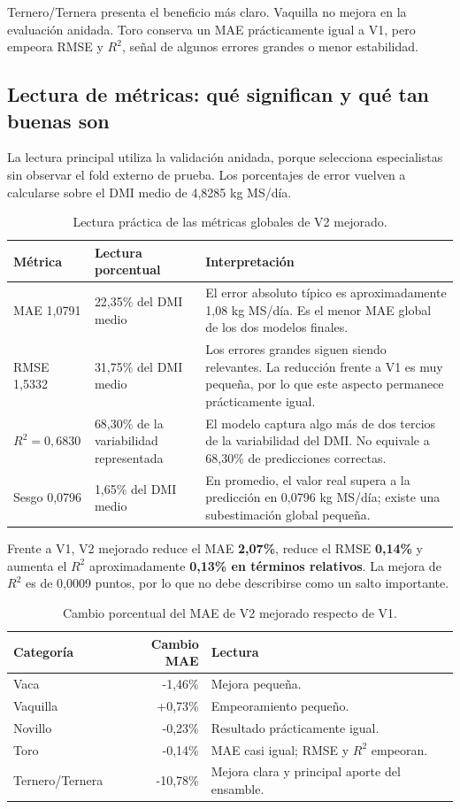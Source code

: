 \documentclass[11pt,a4paper]{article}
\begin{document}
Ternero/Ternera presenta el beneficio más claro. Vaquilla no mejora en la evaluación anidada. Toro conserva un MAE prácticamente igual a V1, pero empeora RMSE y $R^2$, señal de algunos errores grandes o menor estabilidad.

\subsection{Lectura de métricas: qué significan y qué tan buenas son}

La lectura principal utiliza la validación anidada, porque selecciona especialistas sin observar el fold externo de prueba. Los porcentajes de error vuelven a calcularse sobre el DMI medio de 4,8285 kg MS/día.

\begin{table}[H]
\centering
\caption{Lectura práctica de las métricas globales de V2 mejorado.}
\begin{tabularx}{\textwidth}{p{2.5cm}p{2.8cm}X}
\toprule
\textbf{Métrica} & \textbf{Lectura porcentual} & \textbf{Interpretación}\\
\midrule
MAE 1,0791 & 22,35\% del DMI medio & El error absoluto típico es aproximadamente 1,08 kg MS/día. Es el menor MAE global de los dos modelos finales.\\
RMSE 1,5332 & 31,75\% del DMI medio & Los errores grandes siguen siendo relevantes. La reducción frente a V1 es muy pequeña, por lo que este aspecto permanece prácticamente igual.\\
$R^2=0,6830$ & 68,30\% de la variabilidad representada & El modelo captura algo más de dos tercios de la variabilidad del DMI. No equivale a 68,30\% de predicciones correctas.\\
Sesgo 0,0796 & 1,65\% del DMI medio & En promedio, el valor real supera a la predicción en 0,0796 kg MS/día; existe una subestimación global pequeña.\\
\bottomrule
\end{tabularx}
\end{table}

Frente a V1, V2 mejorado reduce el MAE \textbf{2,07\%}, reduce el RMSE \textbf{0,14\%} y aumenta el $R^2$ aproximadamente \textbf{0,13\% en términos relativos}. La mejora de $R^2$ es de 0,0009 puntos, por lo que no debe describirse como un salto importante.

\begin{table}[H]
\centering
\caption{Cambio porcentual del MAE de V2 mejorado respecto de V1.}
\begin{tabular}{lrl}
\toprule
\textbf{Categoría} & \textbf{Cambio MAE} & \textbf{Lectura}\\
\midrule
Vaca & -1,46\% & Mejora pequeña.\\
Vaquilla & +0,73\% & Empeoramiento pequeño.\\
Novillo & -0,23\% & Resultado prácticamente igual.\\
Toro & -0,14\% & MAE casi igual; RMSE y $R^2$ empeoran.\\
Ternero/Ternera & -10,78\% & Mejora clara y principal aporte del ensamble.\\
\bottomrule
\end{tabular}
\end{table}
\end{document}
